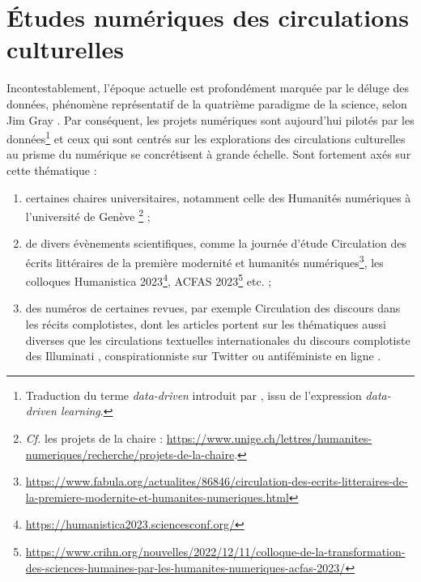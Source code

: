 \section{Études numériques des circulations culturelles}
\label{circulations}
Incontestablement, l'époque actuelle est profondément marquée par le \og{}déluge des données\fg{}, phénomène représentatif de la quatrième paradigme de la science, selon Jim Gray \citep[p.~30]{hey2009jim}. Par conséquent, les projets numériques sont aujourd'hui \og{}pilotés par les données\fg{}\footnote{Traduction du terme \textit{data-driven} introduit par \citet{Johns1991ShouldYB}, issu de l'expression \textit{data-driven learning}.} et ceux qui sont centrés sur les explorations des circulations culturelles au prisme du numérique se concrétisent à grande échelle.
Sont fortement axés sur cette thématique :
\begin{enumerate}
\item certaines chaires universitaires, notamment celle des Humanités numériques à l'université de Genève \citep{joyeux2022circulations}\footnote{\textit{Cf.} les projets de la chaire : \url{https://www.unige.ch/lettres/humanites-numeriques/recherche/projets-de-la-chaire}.} ;
\item de divers évènements scientifiques, comme la journée d'étude \og{}Circulation des écrits littéraires de la première modernité et humanités numériques\fg{}\footnote{\url{https://www.fabula.org/actualites/86846/circulation-des-ecrits-litteraires-de-la-premiere-modernite-et-humanites-numeriques.html}}, les colloques Humanistica 2023\footnote{\url{https://humanistica2023.sciencesconf.org/}}, \textsc{ACFAS} 2023\footnote{\url{https://www.crihn.org/nouvelles/2022/12/11/colloque-de-la-transformation-des-sciences-humaines-par-les-humanites-numeriques-acfas-2023/}} etc. ;
\item des numéros de certaines revues, par exemple \og{}Circulation des discours dans les récits complotistes\fg{}, dont les articles portent sur les thématiques aussi diverses que les circulations textuelles internationales du discours complotiste des \og Illuminati \fg{}  \citep{chaudet2022illuminati}, \og conspirationniste \fg{} sur Twitter \citep{giry2022etudier} ou antiféministe en ligne \citep{morin2022discours}. 
\end{enumerate}

